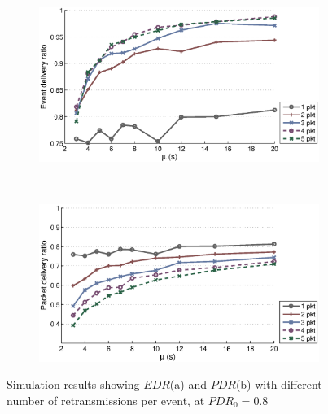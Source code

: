 \begin{figure}[p]
    \centering
    \begin{subfigure}[t]{0.9\textwidth}
        \centering
        \includegraphics[width=\textwidth] {../../sw/pc/matlab/simulation-result/retrans-count-edr-250evt-pdr0.8.eps}
        \caption{}
    \end{subfigure} 
    \\
    \begin{subfigure}[t]{0.9\textwidth}
        \centering
        \includegraphics[width=\textwidth] {../../sw/pc/matlab/simulation-result/retrans-count-pdr-250evt-pdr0.8.eps}
        \caption{}
    \end{subfigure}
    \caption[$EDR$ and $PDR$ with different transmission redundancy, $PDR_0 = 0.8$]{Simulation results showing $EDR$(a) and $PDR$(b) with different number of retransmissions per event, at $PDR_0 = 0.8$}\label{fig:retrans-lambda-0.8}
\end{figure}


